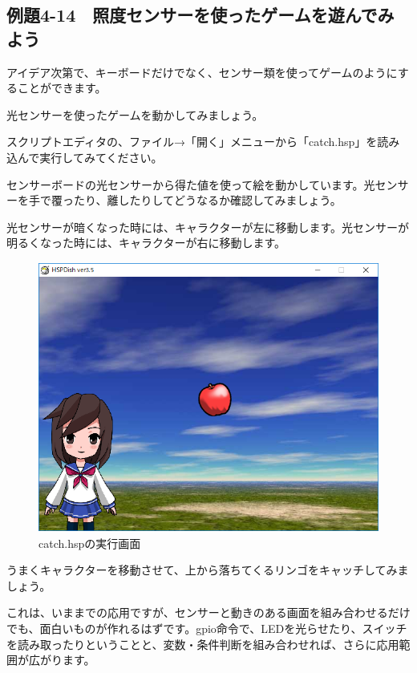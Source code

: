 \newpage
\subsection{例題4-14　照度センサーを使ったゲームを遊んでみよう}

\begin{description}
    \item {}
\end{description}


アイデア次第で、キーボードだけでなく、センサー類を使ってゲームのようにすることができます。

光センサーを使ったゲームを動かしてみましょう。


スクリプトエディタの、ファイル→「開く」メニューから「catch.hsp」を読み込んで実行してみてください。


\begin{description}
    \item {}
\end{description}

センサーボードの光センサーから得た値を使って絵を動かしています。光センサーを手で覆ったり、離したりしてどうなるか確認してみましょう。

光センサーが暗くなった時には、キャラクターが左に移動します。光センサーが明るくなった時には、キャラクターが右に移動します。


\begin{figure}[H]
    \begin{center}
      \includegraphics[keepaspectratio,width=11.269cm,height=8.89cm]{text04-img/text04-img041.png}
      \caption{catch.hspの実行画面}
    \end{center}
    \label{fig:prog_menu}
\end{figure}

うまくキャラクターを移動させて、上から落ちてくるリンゴをキャッチしてみましょう。

これは、いままでの応用ですが、センサーと動きのある画面を組み合わせるだけでも、面白いものが作れるはずです。gpio命令で、LEDを光らせたり、スイッチを読み取ったりということと、変数・条件判断を組み合わせれば、さらに応用範囲が広がります。













